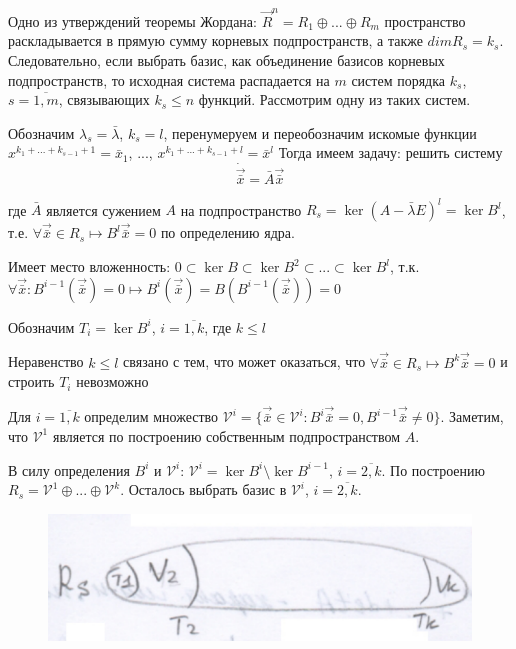 Одно из утверждений теоремы Жордана: $\vec{R}^n = R_1 \oplus ... \oplus R_m $ пространство раскладывается в прямую сумму корневых подпространств, а также $dim R_s = k_s$.
Следовательно, если выбрать базис, как объединение базисов корневых подпространств, то исходная система распадается на $m$ систем порядка $k_s$, $s = \overline{1, m}$, связывающих $k_s \leq n$ функций. Рассмотрим одну из таких систем.

Обозначим $\lambda_s = \bar{\lambda}$, $k_s = l$, перенумеруем и переобозначим искомые функции $x^{k_1 + ... + k_{s-1} + 1} = \bar{x}_1$, ..., $x^{k_1 + ... + k_{s - 1} + l} = \bar{x}^l$ 
Тогда имеем задачу: решить систему
\begin{equation}
  \dot{\vec{\bar{x}}} = \bar{A} \vec{\bar{x}}
\end{equation}

где $\bar{A}$ является сужением $A$ на подпространство $R_s = \ker (A - \bar{\lambda} E)^{l} = \ker B^l$, т.е. $\forall \vec{\bar{x}} \in R_s \mapsto B^l \vec{\bar{x}} = 0$ по определению ядра. 

Имеет место вложенность: $ 0 \subset \ker B \subset \ker B^2 \subset ... \subset \ker B^l$, 
т.к. $\forall \vec{\bar{x}}: B^{i-1}(\vec{\bar{x}}) = 0 \mapsto B^{i}(\vec{\bar{x}}) = B(B^{i-1}(\vec{\bar{x}})) = 0$

Обозначим $T_i = \ker B^i$, $i = \overline{1, k}$, где $k \leq l$

\begin{remark}
  Неравенство $k \leq l$ связано с тем, что может оказаться, что $\forall \vec{\bar{x}} \in R_s \mapsto B^k \vec{\bar{x}} = 0$ и строить $T_i$ невозможно
\end{remark}

Для $i = \overline{1, k}$ определим множество $\mathcal{V}^i = \{\vec{\bar{x}} \in \mathcal{V}^i: B^i \vec{\bar{x}} =0 , B^{i-1}\vec{\bar{x}} \neq 0 \}$.
Заметим, что $\mathcal{V}^1$ является по построению собственным подпространством $A$.

В силу определения $B^i$ и $\mathcal{V}^i$: $\mathcal{V}^i = \ker B^i \setminus \ker B^{i-1}$, $i = \overline{2, k}$. По построению $R_s = \mathcal{V}^1 \oplus ... \oplus \mathcal{V}^k$. Осталось выбрать базис в $\mathcal{V}^i$, $i = \overline{2, k}$. 

\begin{figure}[!h]
  \centering
  \includegraphics[width=0.5\linewidth]{"images/Issue7-1.png"}
  \caption[]{}
\end{figure}

